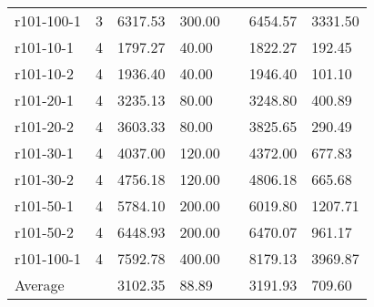 \documentclass[final,5p,times,twocolumn]{elsarticle}
\begin{document}
{{{{{{{{{{{{\begin{table}[htbp]
\begin{tabular}{l l l l l l l}
r101-100-1&3&6317.53&300.00&&6454.57&3331.50\\
r101-10-1&4&1797.27&40.00&&1822.27&192.45\\
r101-10-2&4&1936.40&40.00&&1946.40&101.10\\
r101-20-1&4&3235.13&80.00&&3248.80&400.89\\
r101-20-2&4&3603.33&80.00&&3825.65&290.49\\
r101-30-1&4&4037.00&120.00&&4372.00&677.83\\
r101-30-2&4&4756.18&120.00&&4806.18&665.68\\
r101-50-1&4&5784.10&200.00&&6019.80&1207.71\\
r101-50-2&4&6448.93&200.00&&6470.07&961.17\\
r101-100-1&4&7592.78&400.00&&8179.13&3969.87\\
\hline
Average&&3102.35&88.89&&3191.93&709.60\\
\hline
\end{tabular}
\label{tab:pt300_20}
\end{table}


}}}}}}}}}}}}
\end{document}
